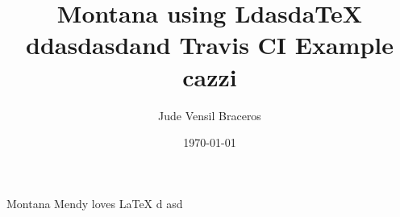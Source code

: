 \documentclass{article}
\title{Montana using LdasdaTeX ddasdasdand Travis CI Example cazzi}
\author{Jude Vensil Braceros}
\date{\today}
\begin{document}
\maketitle

Montana Mendy loves LaTeX d asd
\end{document}
